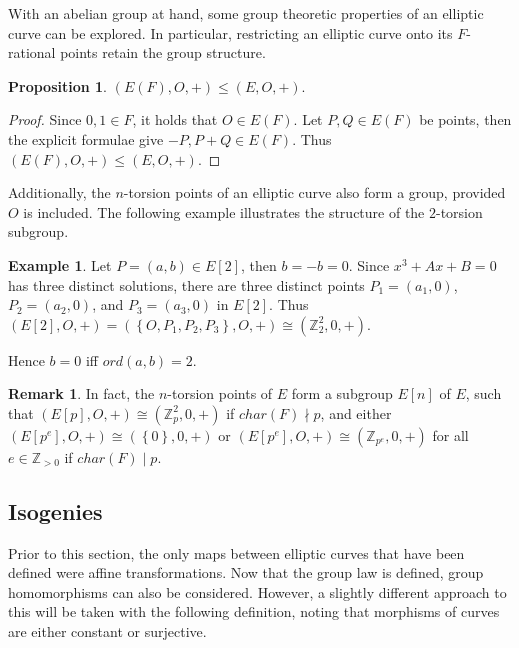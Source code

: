 \documentclass{article}
\newcommand{\Z}{\mathbb{Z}}
\newcommand{\rb}[1]{\left( #1 \right)}
\renewcommand{\sb}[1]{\left[ #1 \right]}
\newcommand{\cb}[1]{\left\{ #1 \right\}}
\theoremstyle{definition}\newtheorem*{definition}{Definition}
\theoremstyle{definition}\newtheorem*{example}{Example}
\theoremstyle{definition}\newtheorem*{remark}{Remark}
\newtheorem{proposition}{Proposition}[subsection]
\begin{document}
With an abelian group at hand, some group theoretic properties of an elliptic curve can be explored. In particular, restricting an elliptic curve onto its $ F $-rational points retain the group structure.

\begin{proposition}
$ \rb{E\rb{F}, O, +} \le \rb{E, O, +} $.
\end{proposition}

\begin{proof}
Since $ 0, 1 \in F $, it holds that $ O \in E\rb{F} $. Let $ P, Q \in E\rb{F} $ be points, then the explicit formulae give $ -P, P + Q \in E\rb{F} $. Thus $ \rb{E\rb{F}, O, +} \le \rb{E, O, +} $.
\end{proof}

Additionally, the $ n $-torsion points of an elliptic curve also form a group, provided $ O $ is included. The following example illustrates the structure of the $ 2 $-torsion subgroup.

\begin{example}
Let $ P = \rb{a, b} \in E\sb{2} $, then $ b = -b = 0 $. Since $ x^3 + Ax + B = 0 $ has three distinct solutions, there are three distinct points $ P_1 = \rb{a_1, 0} $, $ P_2 = \rb{a_2, 0} $, and $ P_3 = \rb{a_3, 0} $ in $ E\sb{2} $. Thus $ \rb{E\sb{2}, O, +} = \rb{\cb{O, P_1, P_2, P_3}, O, +} \cong \rb{\Z_2^2, 0, +} $.
\end{example}

Hence $ b = 0 $ iff $ ord\rb{a, b} = 2 $.

\begin{remark}
In fact, the $ n $-torsion points of $ E $ form a subgroup $ E\sb{n} $ of $ E $, such that $ \rb{E\sb{p}, O, +} \cong \rb{\Z_p^2, 0, +} $ if $ char\rb{F} \nmid p $, and either $ \rb{E\sb{p^e}, O, +} \cong \rb{\cb{0}, 0, +} $ or $ \rb{E\sb{p^e}, O, +} \cong \rb{\Z_{p^e}, 0, +} $ for all $ e \in \Z_{> 0} $ if $ char\rb{F} \mid p $.
\end{remark}

\pagebreak

\subsection{Isogenies}

Prior to this section, the only maps between elliptic curves that have been defined were affine transformations. Now that the group law is defined, group homomorphisms can also be considered. However, a slightly different approach to this will be taken with the following definition, noting that morphisms of curves are either constant or surjective.
\end{document}
